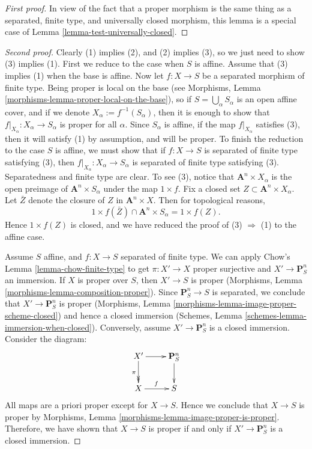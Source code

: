 \documentclass[10pt,a4paper]{amsart}
\theoremstyle{plain}
\theoremstyle{definition}
\theoremstyle{remark}
\numberwithin{equation}{subsection}
\begin{document}
\begin{proof}[First proof]
In view of the fact that a proper morphism is the same thing as
a separated, finite type, and universally closed morphism, this
lemma is a special case of Lemma \ref{lemma-test-universally-closed}.
\end{proof}

\begin{proof}[Second proof]
Clearly (1) implies (2), and (2) implies (3), so we just need to show (3)
implies (1).
First we reduce to the case when $S$ is affine.  Assume that (3) implies (1)
when the base is affine.  Now let $f: X \to S$ be a separated morphism of
finite type.  Being proper is local on the base
(see Morphisms, Lemma \ref{morphisms-lemma-proper-local-on-the-base}), so if
$S = \bigcup_\alpha S_\alpha$ is an open affine cover, and if
we denote $X_\alpha := f^{-1}(S_\alpha)$, then it is
enough to show that $f|_{X_\alpha}: X_\alpha \to S_\alpha$ is proper
for all $\alpha$.  Since $S_\alpha$ is affine, if
the map $f|_{X_\alpha}$ satisfies (3), then it will satisfy (1)
by assumption, and will be proper.  To finish the reduction to the
case $S$ is affine, we must show that if $f: X \to S$ is separated of
finite type satisfying (3), then $f|_{X_\alpha} : X_\alpha \to S_\alpha$
is separated of finite type satisfying (3).  Separatedness and finite
type are clear.  To see (3), notice that
$\mathbf{A}^n \times X_\alpha$ is the open preimage of
$\mathbf{A}^n \times S_\alpha$ under the map $1 \times f$.  Fix a closed
set $Z \subset \mathbf A^n \times X_\alpha$.  Let $\bar Z$ denote the
closure of $Z$ in $\mathbf{A}^n \times X$.  Then for topological
reasons,
$$
1 \times f(\bar Z) \cap \mathbf{A}^n \times S_\alpha  = 1 \times f(Z).
$$
Hence $1 \times f(Z)$ is closed, and we have reduced the proof of
(3) $\Rightarrow$ (1) to the affine case.

\medskip\noindent
Assume $S$ affine, and $f : X \to S$ separated of finite type.
We can apply Chow's Lemma \ref{lemma-chow-finite-type}
to get $\pi : X' \to X$ proper surjective and $X' \to \mathbf{P}^n_S$
an immersion. If $X$ is proper over $S$, then $X' \to S$ is proper
(Morphisms, Lemma \ref{morphisms-lemma-composition-proper}). Since
$\mathbf{P}^n_S \to S$ is separated, we conclude that $X' \to
\mathbf{P}^n_S$ is proper
(Morphisms, Lemma \ref{morphisms-lemma-image-proper-scheme-closed})
and hence a closed immersion
(Schemes, Lemma \ref{schemes-lemma-immersion-when-closed}).
Conversely, assume $X' \to \mathbf{P}^n_S$ is a closed immersion.
Consider the diagram:
\begin{equation}
\label{equation-check-proper}
\xymatrix{
X' \ar[r] \ar@{->>}[d]_{\pi} &
\mathbf{P}^n_S \ar[d] \\
X \ar[r]^f & S
}
\end{equation}
All maps are a priori proper except for $X \to S$.
Hence we conclude that $X \to S$ is proper by
Morphisms, Lemma \ref{morphisms-lemma-image-proper-is-proper}.
Therefore, we have shown that $X \to S$ is proper if and only if
$X' \to \mathbf{P}^n_S$ is a closed immersion.


\end{proof}
\end{document}
